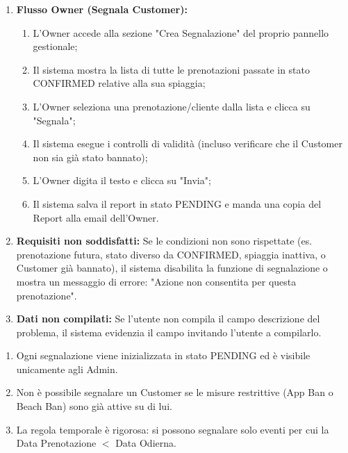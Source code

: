 \documentclass{article}
\begin{document}
	{
		\begin{enumerate}[nosep, leftmargin=25px]
			\item[\textbf{1a.}] \textbf{Flusso Owner (Segnala Customer):} 
			\begin{enumerate}[nosep, leftmargin=*]
				\item[i.] L'Owner accede alla sezione "Crea Segnalazione" del proprio pannello gestionale;
				\item[ii.] Il sistema mostra la lista di tutte le prenotazioni passate in stato CONFIRMED relative alla sua spiaggia;
				\item[iii.] L'Owner seleziona una prenotazione/cliente dalla lista e clicca su "Segnala";
				\item[iv.] Il sistema esegue i controlli di validità (incluso verificare che il Customer non sia già stato bannato);
				\item[v.] L'Owner digita il testo e clicca su "Invia";
				\item[vi.] Il sistema salva il report in stato PENDING e manda una copia del Report alla email dell'Owner.
			\end{enumerate}
			\item[\textbf{4a-e.}] \textbf{Requisiti non soddisfatti:} Se le condizioni non sono rispettate (es. prenotazione futura, stato diverso da CONFIRMED, spiaggia inattiva, o Customer già bannato), il sistema disabilita la funzione di segnalazione o mostra un messaggio di errore: "Azione non consentita per questa prenotazione".
			\item[\textbf{6a-e.}] \textbf{Dati non compilati:} Se l'utente non compila il campo descrizione del problema, il sistema evidenzia il campo invitando l'utente a compilarlo.
		\end{enumerate}
	}
	{
		\begin{enumerate}[nosep, leftmargin=*]
			\item[•] Ogni segnalazione viene inizializzata in stato PENDING ed è visibile unicamente agli Admin.
			\item[•] Non è possibile segnalare un Customer se le misure restrittive (App Ban o Beach Ban) sono già attive su di lui.
			\item[•] La regola temporale è rigorosa: si possono segnalare solo eventi per cui la Data Prenotazione $<$ Data Odierna.
		\end{enumerate}
	}
		
	\newpage
	
\end{document}
